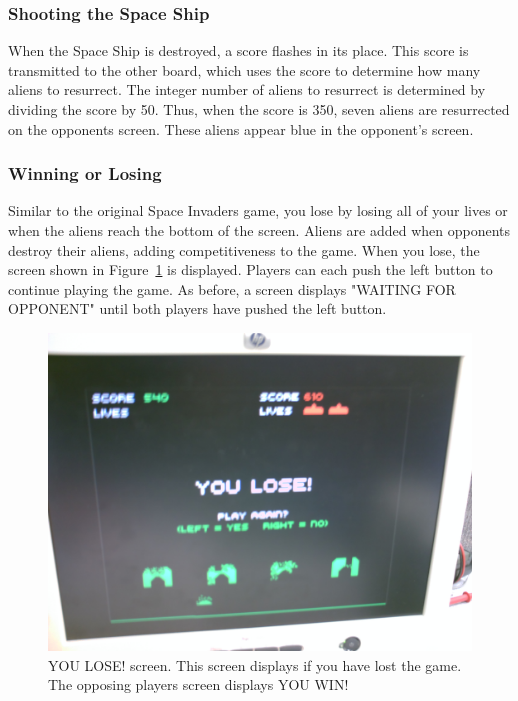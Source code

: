 \documentclass[11pt,letter,oneside]{report}
\begin{document}
\subsubsection{Shooting the Space Ship}
When the Space Ship is destroyed, a score flashes in its place. This score is transmitted to the other board, which uses the score to determine how many aliens to resurrect. The integer number of aliens to resurrect is determined by dividing the score by 50. Thus, when the score is 350, seven aliens are resurrected on the opponents screen. These aliens appear blue in the opponent's screen.

\subsubsection{Winning or Losing}
Similar to the original Space Invaders game, you lose by losing all of your lives or when the aliens reach the bottom of the screen. Aliens are added when opponents destroy their aliens, adding competitiveness to the game. When you lose, the screen shown in Figure~\ref{fig:lose} is displayed. Players can each push the left button to continue playing the game. As before, a screen displays "WAITING FOR OPPONENT" until both players have pushed the left button.

\begin{figure}[H]
\centering
\includegraphics[scale=.05]{youlose.jpg}
\caption{YOU LOSE! screen. This screen displays if you have lost the game. The opposing players screen displays YOU WIN!}
\label{fig:lose}
\end{figure}
\end{document}
